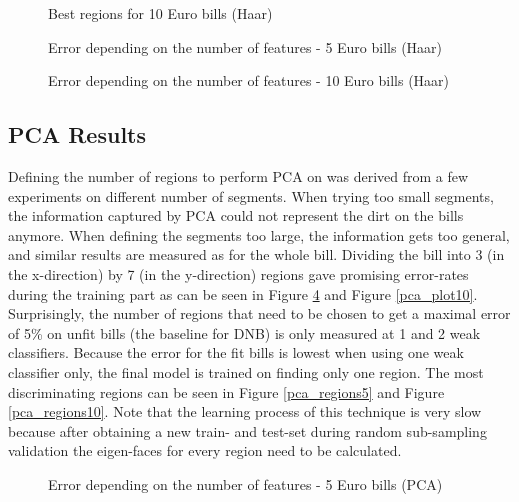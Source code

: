\documentclass[11pt,twocolumn]{article}
\begin{document}
		\begin{figure}[!hbtp]
			\centering
			\caption{Best regions for 10 Euro bills (Haar)}
			\label{haar_regions10}
		\end{figure}

		\begin{figure}[!hbtp]
			\centering
			\caption{Error depending on the number of features - 5 Euro bills (Haar)}
			\label{haar_plot5}
		\end{figure} 

		\begin{figure}[!hbtp]
			\centering
			\caption{Error depending on the number of features - 10 Euro bills (Haar)}
			\label{haar_plot10}
		\end{figure} 

		\subsection{PCA Results}\label{sec:pca_results}
			Defining the number of regions to perform PCA on was derived from a few experiments on different number of segments. When trying too small segments, the information captured by PCA could not represent the dirt on the bills anymore. When defining the segments too large, the information gets too general, and similar results are measured as for the whole bill. Dividing the bill into 3 (in the x-direction) by 7 (in the y-direction) regions gave promising error-rates during the training part as can be seen in Figure \ref{pca_plot5} and Figure \ref{pca_plot10}. Surprisingly, the number of regions that need to be chosen to get a maximal error of 5\% on unfit bills (the baseline for DNB) is only measured at 1 and 2 weak classifiers. Because the error for the fit bills is lowest when using one weak classifier only, the final model is trained on finding only one region. The most discriminating regions can be seen in Figure \ref{pca_regions5} and Figure \ref{pca_regions10}. Note that the learning process of this technique is very slow because after obtaining a new train- and test-set during random sub-sampling validation the eigen-faces for every region need to be calculated.

		\begin{figure}[!hbtp]
			\centering
			\caption{Error depending on the number of features - 5 Euro bills (PCA)}
			\label{pca_plot5}
		\end{figure}
\end{document}
